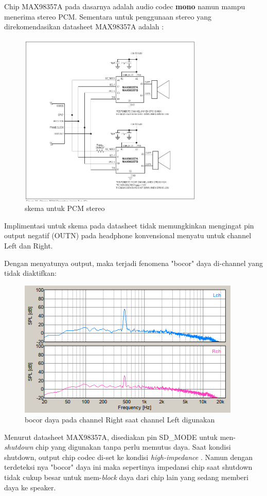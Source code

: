 \documentclass[12pt,]{article}
\begin{document}
	Chip MAX98357A pada dasarnya adalah audio codec \textbf{mono} namun mampu menerima stereo PCM.
	Sementara untuk penggunaan stereo yang direkomendasikan datasheet MAX98357A adalah \cite{Maxim}: 
	
	\begin{figure}[!ht]
		\centering
		\includegraphics[width=250pt]{images/stereo}
		\caption{skema untuk PCM stereo}
	\end{figure}

	Implimentasi untuk skema pada datasheet tidak memungkinkan mengingat pin output negatif (OUTN) pada headphone konvensional menyatu untuk channel Left dan Right.
	
	\newpage
	Dengan menyatunya output, maka terjadi fenomena "bocor" daya di-channel yang tidak diaktifkan:
	
	\begin{figure}[!ht]
		\centering
		\includegraphics[width=300pt]{hasil/test/left_miniso}
		\caption{bocor daya pada channel Right saat channel Left digunakan}
	\end{figure}

	Menurut datasheet MAX98357A, disediakan pin SD\_MODE untuk men-\textit{shutdown} chip yang digunakan tanpa perlu memutus daya.
	Saat kondisi shutdown, output chip codec di-set ke kondisi \textit{high-impedance} \cite{Maxim}.
	Namun dengan terdeteksi nya "bocor" daya ini maka sepertinya impedansi chip saat shutdown tidak cukup besar untuk mem-\textit{block} daya
	dari chip lain yang sedang memberi daya ke speaker.
	
\end{document}
